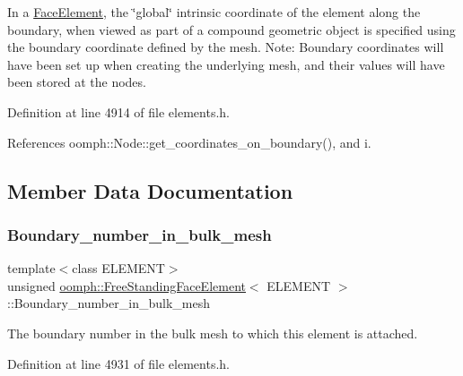 In a \hyperlink{classoomph_1_1FaceElement}{Face\+Element}, the \char`\"{}global\char`\"{} intrinsic coordinate of the element along the boundary, when viewed as part of a compound geometric object is specified using the boundary coordinate defined by the mesh. Note\+: Boundary coordinates will have been set up when creating the underlying mesh, and their values will have been stored at the nodes. 



Definition at line 4914 of file elements.\+h.



References oomph\+::\+Node\+::get\+\_\+coordinates\+\_\+on\+\_\+boundary(), and i.



\subsection{Member Data Documentation}
\mbox{\label{classoomph_1_1FreeStandingFaceElement_a8326eccc4018fcc1df6729a439549aa3}} 
\subsubsection{\texorpdfstring{Boundary\+\_\+number\+\_\+in\+\_\+bulk\+\_\+mesh}{Boundary\_number\_in\_bulk\_mesh}}
{\footnotesize\ttfamily template$<$class E\+L\+E\+M\+E\+NT$>$ \\
unsigned \hyperlink{classoomph_1_1FreeStandingFaceElement}{oomph\+::\+Free\+Standing\+Face\+Element}$<$ E\+L\+E\+M\+E\+NT $>$\+::Boundary\+\_\+number\+\_\+in\+\_\+bulk\+\_\+mesh\hspace{0.3cm}{\ttfamily [protected]}}



The boundary number in the bulk mesh to which this element is attached. 



Definition at line 4931 of file elements.\+h.

\mbox{\label{classoomph_1_1FreeStandingFaceElement_ad11e687447855005a5d79651c1aeb3b7}} 
